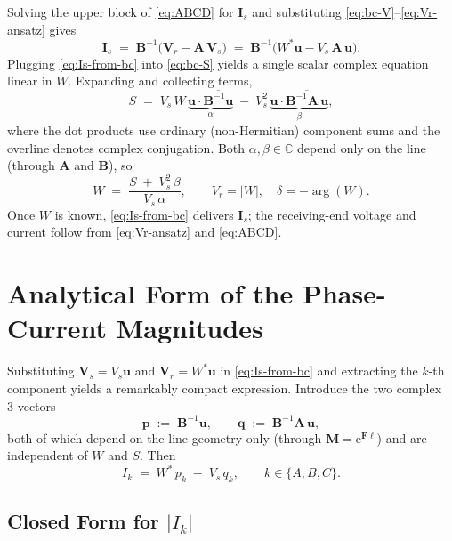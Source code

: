 \documentclass[11pt,a4paper]{article}
\newcommand{\ee}{\mathrm{e}}
\newcommand{\matA}{\bm{A}}
\newcommand{\matB}{\bm{B}}
\newcommand{\matM}{\bm{M}}
\newcommand{\matF}{\bm{F}}
\newcommand{\vV}{\bm{V}}
\newcommand{\vI}{\bm{I}}
\newcommand{\vu}{\bm{u}}
\newcommand{\vp}{\bm{p}}
\newcommand{\vq}{\bm{q}}
\begin{document}
Solving the upper block of \eqref{eq:ABCD} for \(\vI_{s}\) and substituting
\eqref{eq:bc-V}--\eqref{eq:Vr-ansatz} gives
\begin{equation}
\vI_{s}\;=\;\matB^{-1}\bigl(\vV_{r}-\matA\,\vV_{s}\bigr)
\;=\;\matB^{-1}\bigl(W^{*}\vu - V_{s}\,\matA\,\vu\bigr).
\label{eq:Is-from-bc}
\end{equation}
Plugging \eqref{eq:Is-from-bc} into \eqref{eq:bc-S} yields a single scalar
complex equation linear in \(W\). Expanding and collecting terms,
\begin{equation}
S\;=\;V_{s}\,W\,\underbrace{\vu\cdot\overline{\matB^{-1}\vu}}_{\alpha}
\;-\;V_{s}^{2}\,\underbrace{\vu\cdot\overline{\matB^{-1}\matA\,\vu}}_{\beta},
\label{eq:S-linear-in-W}
\end{equation}
where the dot products use ordinary (non-Hermitian) component sums and the
overline denotes complex conjugation. Both \(\alpha,\beta\in\mathbb{C}\) depend
only on the line (through \(\matA\) and \(\matB\)), so
\begin{equation}
\boxed{\;
W\;=\;\frac{S\;+\;V_{s}^{2}\,\beta}{V_{s}\,\alpha},
\qquad V_{r}=|W|,\quad \delta=-\arg(W).
\;}
\label{eq:W-closed-form}
\end{equation}
Once \(W\) is known, \eqref{eq:Is-from-bc} delivers \(\vI_{s}\); the receiving-end voltage and current follow from \eqref{eq:Vr-ansatz} and \eqref{eq:ABCD}.

\section{Analytical Form of the Phase-Current Magnitudes}
\label{sec:analytical-Ik}

Substituting \(\vV_{s}=V_{s}\vu\) and \(\vV_{r}=W^{*}\vu\) in
\eqref{eq:Is-from-bc} and extracting the \(k\)-th component yields a
remarkably compact expression. Introduce the two complex 3-vectors
\begin{equation}
\vp \;:=\; \matB^{-1}\vu,\qquad
\vq \;:=\; \matB^{-1}\matA\,\vu,
\label{eq:pq-def}
\end{equation}
both of which depend on the line geometry only (through
\(\matM=\ee^{\matF\ell}\)) and are independent of \(W\) and \(S\). Then
\begin{equation}
I_{k} \;=\; W^{*}\,p_{k} \;-\; V_{s}\,q_{k},\qquad k\in\{A,B,C\}.
\label{eq:Ik-linear-W}
\end{equation}

\subsection{Closed Form for \texorpdfstring{\(|I_{k}|\)}{|Ik|}}
\end{document}
